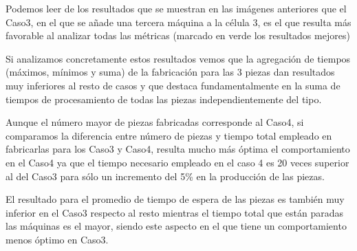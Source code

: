 \documentclass[11pt]{article}
\begin{document}
    Podemos leer de los resultados que se muestran en las imágenes
anteriores que el Caso3, en el que se añade una tercera máquina a la
célula 3, es el que resulta más favorable al analizar todas las métricas
(marcado en verde los resultados mejores)

Si analizamos concretamente estos resultados vemos que la agregación de
tiempos (máximos, mínimos y suma) de la fabricación para las 3 piezas
dan resultados muy inferiores al resto de casos y que destaca
fundamentalmente en la suma de tiempos de procesamiento de todas las
piezas independientemente del tipo.

Aunque el número mayor de piezas fabricadas corresponde al Caso4, si
comparamos la diferencia entre número de piezas y tiempo total empleado
en fabricarlas para los Caso3 y Caso4, resulta mucho más óptima el
comportamiento en el Caso4 ya que el tiempo necesario empleado en el
caso 4 es 20 veces superior al del Caso3 para sólo un incremento del 5\%
en la producción de las piezas.

El resultado para el promedio de tiempo de espera de las piezas es
también muy inferior en el Caso3 respecto al resto mientras el tiempo
total que están paradas las máquinas es el mayor, siendo este aspecto en
el que tiene un comportamiento menos óptimo en Caso3.


    
    
    
    
\end{document}
